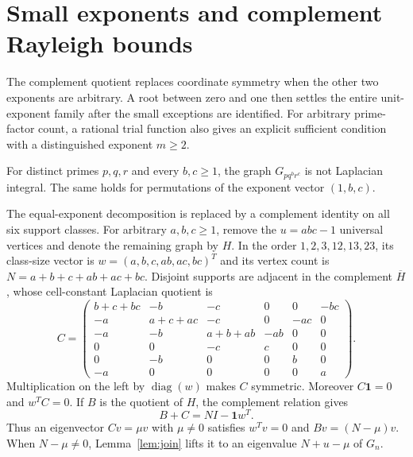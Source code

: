 \section{Small exponents and complement Rayleigh bounds}
\label{sec:unit}

The complement quotient replaces coordinate symmetry when the other
two exponents are arbitrary. A root between zero and one then settles the
entire unit-exponent family after the small exceptions are identified.
For arbitrary prime-factor count, a rational trial function also gives
an explicit sufficient condition with a distinguished exponent $m\geq2$.

\begin{theorem}
\label{thm:unit}
For distinct primes $p,q,r$ and every $b,c\geq1$, the graph
$G_{p q^b r^c}$ is not Laplacian integral. The same holds for
permutations of the exponent vector $(1,b,c)$.
\end{theorem}

The equal-exponent decomposition is replaced by a complement identity
on all six support classes. For arbitrary $a,b,c\geq1$, remove the
$u=abc-1$ universal vertices and denote the remaining graph by $H$.
In the order $1,2,3,12,13,23$, its class-size vector is
$w=(a,b,c,ab,ac,bc)^T$ and its vertex count is
$N=a+b+c+ab+ac+bc$. Disjoint supports are adjacent in the complement
$\overline H$, whose cell-constant Laplacian quotient is
\[
C=\begin{pmatrix}
b+c+bc&-b&-c&0&0&-bc\\
-a&a+c+ac&-c&0&-ac&0\\
-a&-b&a+b+ab&-ab&0&0\\
0&0&-c&c&0&0\\
0&-b&0&0&b&0\\
-a&0&0&0&0&a
\end{pmatrix}.
\]
Multiplication on the left by $\operatorname{diag}(w)$ makes $C$
symmetric. Moreover $C\mathbf1=0$ and $w^TC=0$.
If $B$ is the quotient of $H$, the complement relation gives
\begin{equation}
\label{eq:complement}
B+C=NI-\mathbf1w^T.
\end{equation}
Thus an eigenvector $Cv=\mu v$ with $\mu\ne0$ satisfies $w^Tv=0$
and $Bv=(N-\mu)v$. When $N-\mu\ne0$, Lemma~\ref{lem:join}
lifts it to an eigenvalue $N+u-\mu$ of $G_n$.

